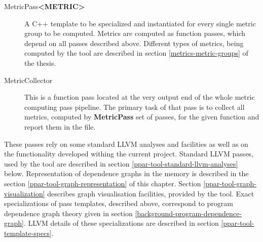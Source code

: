 \begin{description}
	\item [MetricPass\textbf{\textless METRIC\textgreater}] A C++ template to be specialized and instantiated for every single metric group to be computed. Metrics are computed as function passes, which depend on all passes described above. Different types of metrics, being computed by the tool are described in section \ref{metrics-metric-groups} of the thesis.
	
	\item [MetricCollector] This is a function pass located at the very output end of the whole metric computing pass pipeline. The primary task of that pass is to collect all metrics, computed by \textbf{MetricPass} set of passes, for the given function and report them in the file.     

\end{description} 

\quad These passes rely on some standard LLVM analyses and facilities as well as on the functionality developed withing the current project. Standard LLVM passes, used by the tool are described in section \ref{ppar-tool-standard-llvm-analyses} below. Representation of dependence graphs in the memory is described in the section \ref{ppar-tool-graph-representation} of this chapter. Section \ref{ppar-tool-graph-visualization} describes graph visualisation facilities, provided by the tool. Exact specializations of pass templates, described above, correspond to program dependence graph theory given in section \ref{background-program-dependence-graph}. LLVM details of these specializations are described in section \ref{ppar-tool-template-specs}.  

